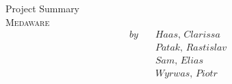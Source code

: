 \vspace*{\fill}
\titleornament
\vspace*{\fill}
\begin{center}
	{
		\Large Project Summary
	} \\[2\baselineskip]
	{
		\Huge \textsc{Medaware}
	} \\[\baselineskip]
	\begin{align*}
		\textit{by} \quad &\textit{Haas, Clarissa} \\
				  &\textit{Patak, Rastislav} \\
				  &\textit{Sam, Elias} \\
				  &\textit{Wyrwas, Piotr}
	\end{align*}
\end{center}
\vspace*{\fill}
{
	\hspace*{\fill}
	\titleornament
}
\vspace*{\fill}
